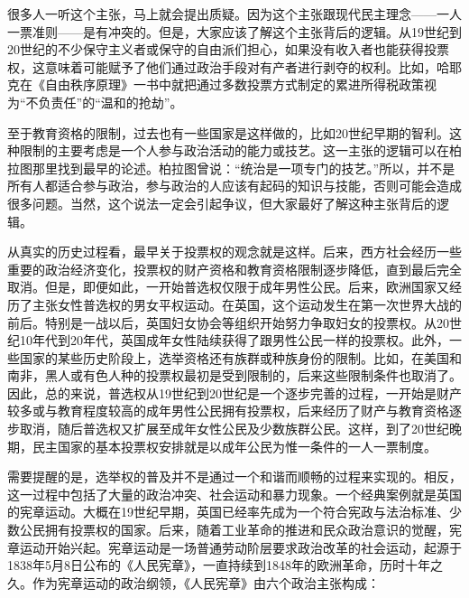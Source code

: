 很多人一听这个主张，马上就会提出质疑。因为这个主张跟现代民主理念——一人一票准则——是有冲突的。但是，大家应该了解这个主张背后的逻辑。从19世纪到20世纪的不少保守主义者或保守的自由派们担心，如果没有收入者也能获得投票权，这意味着可能赋予了他们通过政治手段对有产者进行剥夺的权利。比如，哈耶克在《自由秩序原理》一书中就把通过多数投票方式制定的累进所得税政策视为“不负责任”的“温和的抢劫”。

至于教育资格的限制，过去也有一些国家是这样做的，比如20世纪早期的智利。这种限制的主要考虑是一个人参与政治活动的能力或技艺。这一主张的逻辑可以在柏拉图那里找到最早的论述。柏拉图曾说：“统治是一项专门的技艺。”所以，并不是所有人都适合参与政治，参与政治的人应该有起码的知识与技能，否则可能会造成很多问题。当然，这个说法一定会引起争议，但大家最好了解这种主张背后的逻辑。

从真实的历史过程看，最早关于投票权的观念就是这样。后来，西方社会经历一些重要的政治经济变化，投票权的财产资格和教育资格限制逐步降低，直到最后完全取消。但是，即便如此，一开始普选权仅限于成年男性公民。后来，欧洲国家又经历了主张女性普选权的男女平权运动。在英国，这个运动发生在第一次世界大战的前后。特别是一战以后，英国妇女协会等组织开始努力争取妇女的投票权。从20世纪10年代到20年代，英国成年女性陆续获得了跟男性公民一样的投票权。此外，一些国家的某些历史阶段上，选举资格还有族群或种族身份的限制。比如，在美国和南非，黑人或有色人种的投票权最初是受到限制的，后来这些限制条件也取消了。因此，总的来说，普选权从19世纪到20世纪是一个逐步完善的过程，一开始是财产较多或与教育程度较高的成年男性公民拥有投票权，后来经历了财产与教育资格逐步取消，随后普选权又扩展至成年女性公民及少数族群公民。这样，到了20世纪晚期，民主国家的基本投票权安排就是以成年公民为惟一条件的一人一票制度。

需要提醒的是，选举权的普及并不是通过一个和谐而顺畅的过程来实现的。相反，这一过程中包括了大量的政治冲突、社会运动和暴力现象。一个经典案例就是英国的宪章运动。大概在19世纪早期，英国已经率先成为一个符合宪政与法治标准、少数公民拥有投票权的国家。后来，随着工业革命的推进和民众政治意识的觉醒，宪章运动开始兴起。宪章运动是一场普通劳动阶层要求政治改革的社会运动，起源于1838年5月8日公布的《人民宪章》，一直持续到1848年的欧洲革命，历时十年之久。作为宪章运动的政治纲领，《人民宪章》由六个政治主张构成：


